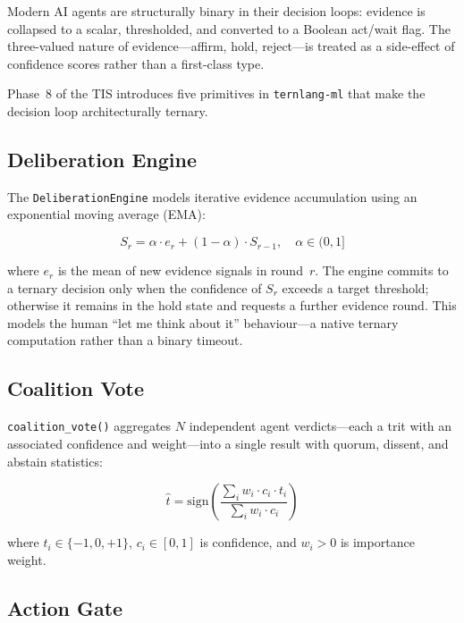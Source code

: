\documentclass[journal,10pt,twocolumn]{IEEEtran}
\begin{document}
Modern AI agents are structurally binary in their decision loops: evidence
is collapsed to a scalar, thresholded, and converted to a Boolean act/wait
flag. The three-valued nature of evidence—affirm, hold, reject—is treated
as a side-effect of confidence scores rather than a first-class type.

Phase~8 of the TIS introduces five primitives in \texttt{ternlang-ml} that
make the decision loop architecturally ternary.

\subsection{Deliberation Engine}

The \texttt{DeliberationEngine} models iterative evidence accumulation using
an exponential moving average (EMA):

\begin{equation}
  S_r = \alpha \cdot e_r + (1-\alpha) \cdot S_{r-1},
  \quad \alpha \in (0, 1]
  \label{eq:ema}
\end{equation}

where $e_r$ is the mean of new evidence signals in round~$r$. The engine
commits to a ternary decision only when the confidence of $S_r$ exceeds a
target threshold; otherwise it remains in the hold state and requests a
further evidence round. This models the human ``let me think about it''
behaviour—a native ternary computation rather than a binary timeout.

\subsection{Coalition Vote}

\texttt{coalition\_vote()} aggregates $N$ independent agent verdicts—each a
trit with an associated confidence and weight—into a single result with
quorum, dissent, and abstain statistics:

\begin{equation}
  \hat{t} = \mathrm{sign}\!\left(
    \frac{\sum_i w_i \cdot c_i \cdot t_i}{\sum_i w_i \cdot c_i}
  \right)
  \label{eq:coalition}
\end{equation}

where $t_i \in \{-1,0,+1\}$, $c_i \in [0,1]$ is confidence, and
$w_i > 0$ is importance weight.

\subsection{Action Gate}
\end{document}
